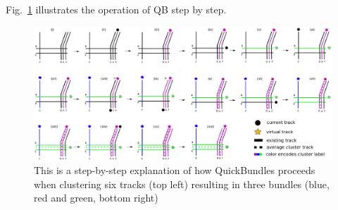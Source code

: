 \documentclass{bioinfo}
\begin{document}
Fig.~\ref{Fig:LSC_simple} illustrates the operation of QB step by step.


\begin{figure}[t]
\centering\includegraphics[width=160mm,angle=0]{Figures/Fig_1_QB_algorithm}
\caption{This is a step-by-step explanation of how QuickBundles proceeds when clustering six tracks (top left) resulting in three bundles (blue, red and green, bottom right)}
\label{Fig:LSC_simple}
\end{figure}
\end{document}
